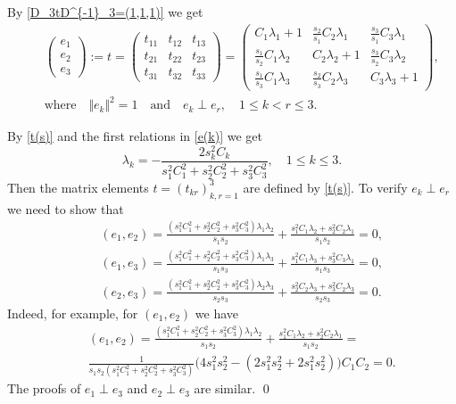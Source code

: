 \documentclass[preprint,12pt]{elsarticle}
\numberwithin{equation}{section}
\begin{document}
\begin{pf}
By \eqref{D_3tD^{-1}_3=(1,1,1)} 
we get
\begin{eqnarray}
\label{t(s)}
&& 
\left(
\begin{smallmatrix}
e_1\\
e_2\\
e_3
\end{smallmatrix}
\right):=
t=\left(
\begin{smallmatrix}
t_{11}&t_{12}&t_{13}\\
t_{21}&t_{22}&t_{23}\\
t_{31}&t_{32}&t_{33}
\end{smallmatrix}
\right)=
\left(\begin{smallmatrix}
C_1\lambda_1 +1&\frac{s_2}{s_1}C_2\lambda_1&\frac{s_3}{s_1}C_3\lambda_1\\
\frac{s_1}{s_2}C_1\lambda_2&C_2\lambda_2 +1&\frac{s_3}{s_2}C_3\lambda_2\\
\frac{s_1}{s_3}C_1\lambda_3&\frac{s_2}{s_3}C_2\lambda_3&C_3\lambda_3 +1
\end{smallmatrix}
\right),\\
\label{e(k)}
&& \text{where}\quad \Vert e_k\Vert^2=1\quad \text{and}\quad e_k\perp e_r,\quad 1\leq k<r\leq 3.
\end{eqnarray}

By  \eqref{t(s)} and the first relations in \eqref{e(k)} we get
\begin{equation}
 \label{lambda.m=3}
\lambda_k=-\frac{2s^2_kC_k}{s^2_1C^2_1+s^2_2C^2_2+s^2_3C^2_3},\quad 1\leq k\leq 3.
\end{equation}
Then the matrix elements $t=(t_{kr})_{k,r=1}^3$ are defined by \eqref{t(s)}.  To verify $e_k\perp e_r$ we need to show that
\begin{eqnarray*}
&& (e_1,e_2)=\frac{(s^2_1C^2_1+s^2_2C^2_2+s^2_3C^2_3)\lambda_1\lambda_2}{s_1s_2}+\frac{s^2_1C_1\lambda_2+s^2_2C_2\lambda_1}{s_1s_2}=0,\\
&& (e_1,e_3)=\frac{(s^2_1C^2_1+s^2_2C^2_2+s^2_3C^2_3)\lambda_1\lambda_3}{s_1s_3}+\frac{s^2_1C_1\lambda_3+s^2_3C_3\lambda_1}{s_1s_3}=0,\\
&& (e_2,e_3)=\frac{(s^2_1C^2_1+s^2_2C^2_2+s^2_3C^2_3)\lambda_2\lambda_3}{s_2s_3}+\frac{s^2_2C_2\lambda_3+s^2_3C_2\lambda_3}{s_2s_3}=0.
\end{eqnarray*}
Indeed, for example, for $(e_1,e_2)$ we have
\begin{eqnarray*}
&& (e_1,e_2)=\frac{(s^2_1C^2_1+s^2_2C^2_2+s^2_3C^2_3)\lambda_1\lambda_2}{s_1s_2}+\frac{s^2_1C_1\lambda_2+s^2_2C_2\lambda_1}{s_1s_2}=\\
&&\frac{1}{s_1s_2(s^2_1C_1^2+s^2_2C_2^2+s^2_3C_3^2)}\Big(4s^2_1s^2_2-(2s^2_1s^2_2+2s^2_1s^2_2)\Big)C_1C_2=0.
\end{eqnarray*}
The proofs of $e_1\perp e_3$ and $e_2\perp e_3$ are similar. 
\qed\end{pf}
\end{document}
